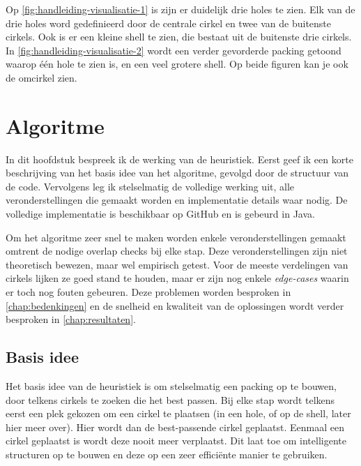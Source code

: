 \documentclass[12pt,a4paper,oneside]{book}
\begin{document}
Op \autoref{fig:handleiding-visualisatie-1} is zijn er duidelijk drie holes te zien.
Elk van de drie holes word gedefinieerd door de centrale cirkel en twee van de buitenste cirkels.
Ook is er een kleine shell te zien, die bestaat uit de buitenste drie cirkels.
In \autoref{fig:handleiding-visualisatie-2} wordt een verder gevorderde packing getoond waarop één hole te zien is, en een veel grotere shell.
Op beide figuren kan je ook de omcirkel zien.

\chapter{Algoritme} \label{chap:algoritme}

In dit hoofdstuk bespreek ik de werking van de heuristiek.
Eerst geef ik een korte beschrijving van het basis idee van het algoritme, gevolgd door de structuur van de code.
Vervolgens leg ik stelselmatig de volledige werking uit, alle veronderstellingen die gemaakt worden en implementatie details waar nodig.
De volledige implementatie is beschikbaar op GitHub \cite{circle-packing-github} en is gebeurd in Java.

Om het algoritme zeer snel te maken worden enkele veronderstellingen gemaakt omtrent de nodige overlap checks bij elke stap.
Deze veronderstellingen zijn niet theoretisch bewezen, maar wel empirisch getest.
Voor de meeste verdelingen van cirkels lijken ze goed stand te houden, maar er zijn nog enkele \textit{edge-cases} waarin er toch nog fouten gebeuren.
Deze problemen worden besproken in \autoref{chap:bedenkingen} en de snelheid en kwaliteit van de oplossingen wordt verder besproken in \autoref{chap:resultaten}.

\section{Basis idee}

Het basis idee van de heuristiek is om stelselmatig een packing op te bouwen, door telkens cirkels te zoeken die het best passen.
Bij elke stap wordt telkens eerst een plek gekozen om een cirkel te plaatsen (in een hole, of op de shell, later hier meer over).
Hier wordt dan de best-passende cirkel geplaatst.
Eenmaal een cirkel geplaatst is wordt deze nooit meer verplaatst.
Dit laat toe om intelligente structuren op te bouwen en deze op een zeer efficiënte manier te gebruiken.
\end{document}
